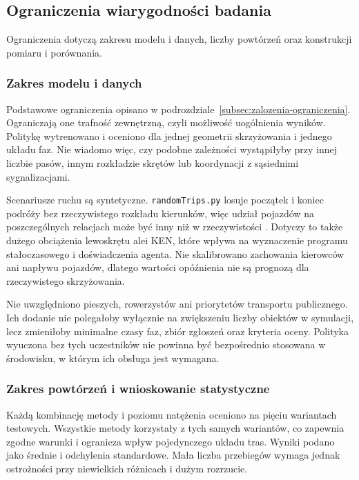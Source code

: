 \subsection{Ograniczenia wiarygodności badania}
\label{subsec:ograniczenia-wiarygodnosci}

Ograniczenia dotyczą zakresu modelu i danych, liczby powtórzeń oraz konstrukcji pomiaru i porównania.

\subsubsection{Zakres modelu i danych}

Podstawowe ograniczenia opisano w podrozdziale~\ref{subsec:zalozenia-ograniczenia}. Ograniczają one trafność zewnętrzną, czyli możliwość uogólnienia wyników. Politykę wytrenowano i oceniono dla jednej geometrii skrzyżowania i jednego układu faz. Nie wiadomo więc, czy podobne zależności wystąpiłyby przy innej liczbie pasów, innym rozkładzie skrętów lub koordynacji z sąsiednimi sygnalizacjami.

Scenariusze ruchu są syntetyczne. \texttt{randomTrips.py} losuje początek i koniec podróży bez rzeczywistego rozkładu kierunków, więc udział pojazdów na poszczególnych relacjach może być inny niż w rzeczywistości \cite{sumo_randomtrips_docs}. Dotyczy to także dużego obciążenia lewoskrętu alei KEN, które wpływa na wyznaczenie programu stałoczasowego i doświadczenia agenta. Nie skalibrowano zachowania kierowców ani napływu pojazdów, dlatego wartości opóźnienia nie są prognozą dla rzeczywistego skrzyżowania.

Nie uwzględniono pieszych, rowerzystów ani priorytetów transportu publicznego. Ich dodanie nie polegałoby wyłącznie na zwiększeniu liczby obiektów w symulacji, lecz zmieniłoby minimalne czasy faz, zbiór zgłoszeń oraz kryteria oceny. Polityka wyuczona bez tych uczestników nie powinna być bezpośrednio stosowana w środowisku, w którym ich obsługa jest wymagana.

\subsubsection{Zakres powtórzeń i wnioskowanie statystyczne}

Każdą kombinację metody i poziomu natężenia oceniono na pięciu wariantach testowych. Wszystkie metody korzystały z tych samych wariantów, co zapewnia zgodne warunki i ogranicza wpływ pojedynczego układu tras. Wyniki podano jako średnie i odchylenia standardowe. Mała liczba przebiegów wymaga jednak ostrożności przy niewielkich różnicach i dużym rozrzucie.

